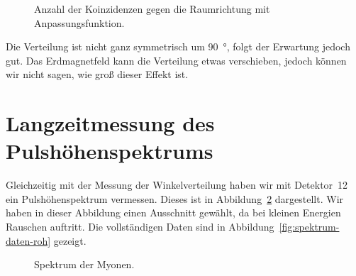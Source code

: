 \documentclass[11pt, ngerman, fleqn, DIV=15, headinclude, BCOR=2cm]{scrreprt}
\begin{document}
\begin{figure}[htbp]
    \centering
    \caption{%
        Anzahl der Koinzidenzen gegen die Raumrichtung mit Anpassungsfunktion.
    }
    \label{fig:winkel-fit}
\end{figure}

Die Verteilung ist nicht ganz symmetrisch um \SI{90}{\degree}, folgt der
Erwartung jedoch gut. Das Erdmagnetfeld kann die Verteilung etwas verschieben,
jedoch können wir nicht sagen, wie groß dieser Effekt ist.

\section{Langzeitmessung des Pulshöhenspektrums}
\label{sec:langzeit_puls}

Gleichzeitig mit der Messung der Winkelverteilung haben wir mit Detektor~12 ein
Pulshöhenspektrum vermessen. Dieses ist in Abbildung~\ref{fig:spektrum-daten}
dargestellt. Wir haben in dieser Abbildung einen Ausschnitt gewählt, da bei
kleinen Energien Rauschen auftritt. Die vollständigen Daten sind in
Abbildung~\ref{fig:spektrum-daten-roh} gezeigt.

\begin{figure}[htbp]
    \centering
    \caption{%
        Spektrum der Myonen.
    }
    \label{fig:spektrum-daten}
\end{figure}
\end{document}
